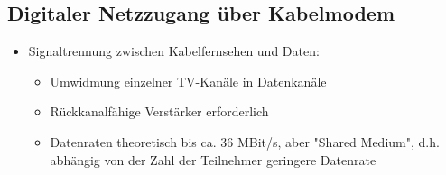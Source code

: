 \subsection{Digitaler Netzzugang über Kabelmodem}
\begin{itemize}
	\item Signaltrennung zwischen Kabelfernsehen und Daten:
	\begin{itemize}
		\item Umwidmung einzelner TV-Kanäle in Datenkanäle
		\item Rückkanalfähige Verstärker erforderlich
		\item Datenraten theoretisch bis ca. 36 MBit/s, aber "Shared Medium", d.h. abhängig von der Zahl der Teilnehmer geringere Datenrate
	\end{itemize}
\end{itemize}

